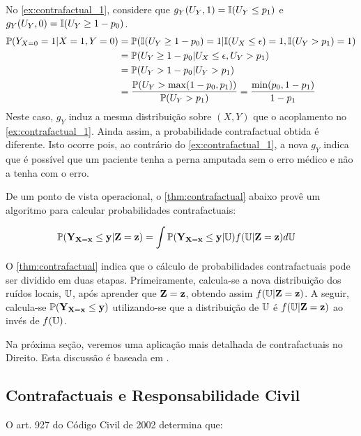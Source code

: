 \begin{example}
 \label{ex:contrafactual_2}
 No \cref{ex:contrafactual_1}, considere que
 $g_Y(U_Y, 1) = {\mathbb I}(U_Y \leq p_1)$ e
 $g_Y(U_Y, 0) = {\mathbb I}(U_Y \geq 1-p_0)$.
 \begin{align*}
  {\mathbb P}(Y_{X=0}=1|X=1,Y=0)
  &= {\mathbb P}({\mathbb I}(U_Y \geq 1-p_0) = 1|{\mathbb I}(U_X \leq \epsilon) = 1, {\mathbb I}(U_Y > p_1) = 1) \\
  &= {\mathbb P}(U_Y \geq 1-p_0|U_X \leq \epsilon, U_Y > p_1) \\
  &= {\mathbb P}(U_Y > 1-p_0|U_Y > p_1) \\
  &= \frac{{\mathbb P}(U_Y > \max(1-p_0,p_1))}{{\mathbb P}(U_Y > p_1)} = \frac{\min(p_0,1-p_1)}{1-p_1}
 \end{align*}
 Neste caso, $g_Y$ induz a mesma distribuição 
 sobre $(X,Y)$ que o acoplamento no \cref{ex:contrafactual_1}.
 Ainda assim, a probabilidade contrafactual obtida é diferente.
 Isto ocorre pois, ao contrário do \cref{ex:contrafactual_1},
 a nova $g_Y$ indica que é possível que um paciente
 tenha a perna amputada sem o erro médico e
 não a tenha com o erro.
\end{example}

De um ponto de vista operacional,
o \cref{thm:contrafactual} abaixo provê
um algoritmo para calcular probabilidades contrafactuais:

\begin{theorem}
 \label{thm:contrafactual}
 \begin{align*}
  {\mathbb P}({\mathbf{Y}}_{{\mathbf{X}}={\mathbf{x}}} \leq {\mathbf{y}}|{\mathbf{Z}}={\mathbf{z}})
  &= \int {\mathbb P}({\mathbf{Y}}_{{\mathbf{X}}={\mathbf{x}}} \leq {\mathbf{y}}|{\mathbb U})f({\mathbb U}|{\mathbf{Z}}={\mathbf{z}})d{\mathbb U}
 \end{align*}
\end{theorem}

O \cref{thm:contrafactual} indica que
o cálculo de probabilidades contrafactuais
pode ser dividido em duas etapas.
Primeiramente, calcula-se a nova distribuição
dos ruídos locais, ${\mathbb U}$, após aprender que
${\mathbf{Z}}={\mathbf{z}}$, obtendo assim $f({\mathbb U}|{\mathbf{Z}}={\mathbf{z}})$.
A seguir, calcula-se 
${\mathbb P}({\mathbf{Y}}_{{\mathbf{X}}={\mathbf{x}}} \leq {\mathbf{y}})$ utilizando-se que
a distribuição de ${\mathbb U}$ é $f({\mathbb U}|{\mathbf{Z}}={\mathbf{z}})$
ao invés de $f({\mathbb U})$.

Na próxima seção, veremos
uma aplicação mais detalhada de
contrafactuais no Direito.
Esta discussão é baseada em
\citet{Stern2019}.

\subsection{Contrafactuais e Responsabilidade Civil}
\label{sec:counterfactual_law}

O art. 927 do Código Civil de 2002 determina que:

